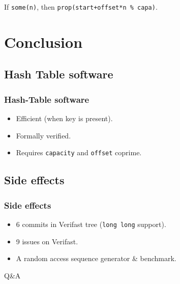 \documentclass{beamer}
\begin{document}
\begin{frame}
		If \texttt{some(n)}, then \texttt{prop(start+offset*n \% capa)}.
	\begin{center}
	\end{center}

\end{frame}

\section{Conclusion}
\subsection{Hash Table software}
\begin{frame}
	\frametitle{Hash-Table software}
	\begin{itemize}
		\item Efficient (when key is present).
		\item Formally verified.
		\item Requires \texttt{capacity} and \texttt{offset} coprime.
	\end{itemize}
\end{frame}

\subsection{Side effects}
\begin{frame}
	\frametitle{Side effects}
	\begin{itemize}
		\item 6 commits in Verifast tree (\texttt{long long} support).
		\item 9 issues on Verifast.
		\item A random access sequence generator \& benchmark.
	\end{itemize}
\end{frame}



\begin{frame}
	\begin{center}
		\huge{Q\&A}
	\end{center}
\end{frame}
\end{document}
